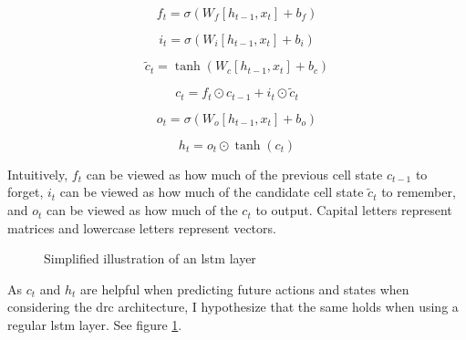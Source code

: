 \documentclass[UKenglish]{uiomasterthesis}
\begin{document}
\[
f_t = \sigma(W_f [h_{t-1}, x_t] + b_f)
\]

\[
i_t = \sigma(W_i [h_{t-1}, x_t] + b_i)
\]

\[
\tilde{c}_t = \tanh(W_c [h_{t-1}, x_t] + b_c)
\]

\[
c_t = f_t \odot c_{t-1} + i_t \odot \tilde{c}_t
\]

\[
o_t = \sigma(W_o [h_{t-1}, x_t] + b_o)
\]

\[
h_t = o_t \odot \tanh(c_t)
\]

Intuitively, $f_t$ can be viewed as how much of the previous cell state $c_{t-1}$ to forget, $i_t$ can be viewed as how much of the candidate cell state $\tilde{c}_t$ to remember, and $o_t$ can be viewed as how much of the $c_{t}$ to output. Capital letters represent matrices and lowercase letters represent vectors.

\begin{center}
\begin{figure}
\caption{Simplified illustration of an \ac{lstm} layer}
\label{fig:lstm}
\end{figure}
\end{center}

As $c_t$ and $h_t$ are helpful when predicting future actions and states \cite{chung2024predictingfutureactionsreinforcement} when considering the \ac{drc} architecture, I hypothesize that the same holds when using a regular \ac{lstm} layer. See figure \ref{fig:lstm}.
\end{document}
